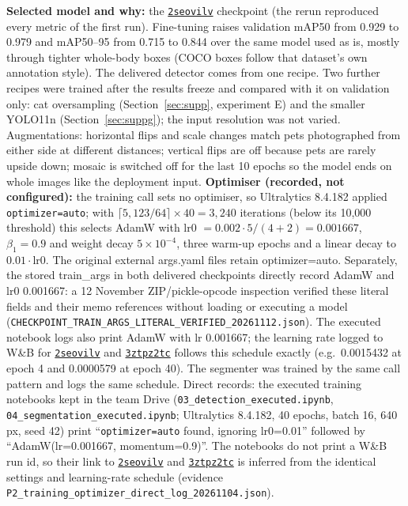 \documentclass[11pt,a4paper]{article}
\newcommand{\run}[1]{\href{https://wandb.ai/yasser-alhajlah-kaust/smart-pet-vision/runs/#1}{\texttt{#1}}}
\begin{document}
\smallskip
\textbf{Selected model and why:} the \run{2seovilv} checkpoint (the rerun reproduced every metric of the first run). Fine-tuning raises validation mAP50 from 0.929 to 0.979 and mAP50--95 from 0.715 to 0.844 over the same model used as is, mostly through tighter whole-body boxes (COCO boxes follow that dataset's own annotation style). The delivered detector comes from one recipe. Two further recipes were trained after the results freeze and compared with it on validation only: cat oversampling (Section~\ref{sec:supp}, experiment E) and the smaller YOLO11n (Section~\ref{sec:suppg}); the input resolution was not varied. Augmentations: horizontal flips and scale changes match pets photographed from either side at different distances; vertical flips are off because pets are rarely upside down; mosaic is switched off for the last 10 epochs so the model ends on whole images like the deployment input. \textbf{Optimiser (recorded, not configured):} the training call sets no optimiser, so Ultralytics 8.4.182 applied \texttt{optimizer=auto}; with $\lceil 5{,}123/64\rceil \times 40 = 3{,}240$ iterations (below its 10,000 threshold) this selects AdamW with lr0 $= 0.002\cdot 5/(4+2) = 0.001667$, $\beta_1 = 0.9$ and weight decay $5\times10^{-4}$, three warm-up epochs and a linear decay to $0.01\cdot$lr0. The original external args.yaml files retain optimizer=auto. Separately, the stored train\_args in both delivered checkpoints directly record AdamW and lr0 0.001667: a 12 November ZIP/pickle-opcode inspection verified these literal fields and their memo references without loading or executing a model (\texttt{CHECKPOINT\_TRAIN\_ARGS\_LITERAL\_VERIFIED\_20261112.json}). The executed notebook logs also print AdamW with lr 0.001667; the learning rate logged to W\&B for \run{2seovilv} and \run{3ztpz2tc} follows this schedule exactly (e.g.\ 0.0015432 at epoch 4 and 0.0000579 at epoch 40). The segmenter was trained by the same call pattern and logs the same schedule. Direct records: the executed training notebooks kept in the team Drive (\texttt{03\_detection\_executed.ipynb}, \texttt{04\_segmentation\_executed.ipynb}; Ultralytics 8.4.182, 40 epochs, batch 16, 640\,px, seed 42) print ``\texttt{optimizer=auto} found, ignoring lr0=0.01'' followed by ``AdamW(lr=0.001667, momentum=0.9)''. The notebooks do not print a W\&B run id, so their link to \run{2seovilv} and \run{3ztpz2tc} is inferred from the identical settings and learning-rate schedule (evidence \texttt{P2\_training\_optimizer\_direct\_log\_}\allowbreak\texttt{20261104.json}).
\end{document}
